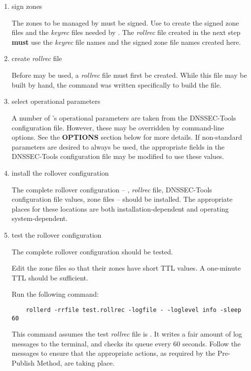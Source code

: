 \begin{enumerate}

\item sign zones\verb" "

The zones to be managed by  must be signed.  Use 
to create the signed zone files and the {\it keyrec} files needed by
.  The {\it rollrec} file created in the next step {\bf must} use
the {\it keyrec} file names and the signed zone file names created here.

\item create {\it rollrec} file\verb" "

Before  may be used, a {\it rollrec} file must first be created.
While this file may be built by hand, the  command was
written specifically to build the file.

\item select operational parameters\verb" "

A number of 's operational parameters are taken from the
DNSSEC-Tools configuration file.  However, these may be overridden
by command-line options.  See the {\bf OPTIONS} section below for more details.
If non-standard parameters are desired to always be used, the appropriate
fields in the DNSSEC-Tools configuration file may be modified to use these
values.

\item install the rollover configuration\verb" "

The complete rollover configuration -- , {\it rollrec} file,
DNSSEC-Tools configuration file values, zone files -- should be installed.  
The appropriate places for these locations are both installation-dependent
and operating system-dependent.

\item test the rollover configuration\verb" "

The complete rollover configuration should be tested.  

Edit the zone files so that their zones have short TTL values.  A one-minute
TTL should be sufficient.

Run the following command:

\begin{verbatim}
    rollerd -rrfile test.rollrec -logfile - -loglevel info -sleep 60
\end{verbatim}

This command assumes the test {\it rollrec} file is .  It
writes a fair amount of log messages to the terminal, and checks its queue
every 60 seconds.  Follow the messages to ensure that the appropriate actions,
as required by the Pre-Publish Method, are taking place.


\end{enumerate}
